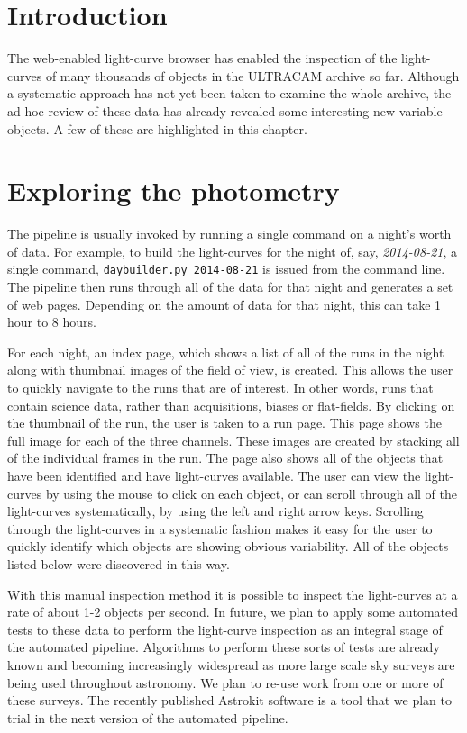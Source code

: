 \section{Introduction}
The web-enabled light-curve browser has enabled the inspection of the light-curves of many thousands of objects in the ULTRACAM archive so far. Although a systematic approach has not yet been taken to examine the whole archive, the ad-hoc review of these data has already revealed some interesting new variable objects. A few of these are highlighted in this chapter. 

\section{Exploring the photometry}
The pipeline is usually invoked by running a single command on a night's worth of data. For example, to build the light-curves for the night of, say, \emph{2014-08-21}, a single command, \texttt{daybuilder.py 2014-08-21} is issued from the command line. The pipeline then runs through all of the data for that night and generates a set of web pages. Depending on the amount of data for that night, this can take 1 hour to 8 hours. 

For each night, an index page, which shows a list of all of the runs in the night along with thumbnail images of the field of view, is created. This allows the user to quickly navigate to the runs that are of interest. In other words, runs that contain science data, rather than acquisitions, biases or flat-fields. By clicking on the thumbnail of the run, the user is taken to a run page. This page shows the full image for each of the three channels. These images are created by stacking all of the individual frames in the run. The page also shows all of the objects that have been identified and have light-curves available. The user can view the light-curves by using the mouse to click on each object, or can scroll through all of the light-curves systematically, by using the left and right arrow keys. Scrolling through the light-curves in a systematic fashion makes it easy for the user to quickly identify which objects are showing obvious variability. All of the objects listed below were discovered in this way. 

With this manual inspection method it is possible to inspect the light-curves at a rate of about 1-2 objects per second. In future, we plan to apply some automated tests to these data to perform the light-curve inspection as an integral stage of the automated pipeline. Algorithms to perform these sorts of tests are already known and becoming increasingly widespread as more large scale sky surveys are being used throughout astronomy. We plan to re-use work from one or more of these surveys. The recently published Astrokit software \citep{Astrokit2014} is a tool that we plan to trial in the next version of the automated pipeline. 

